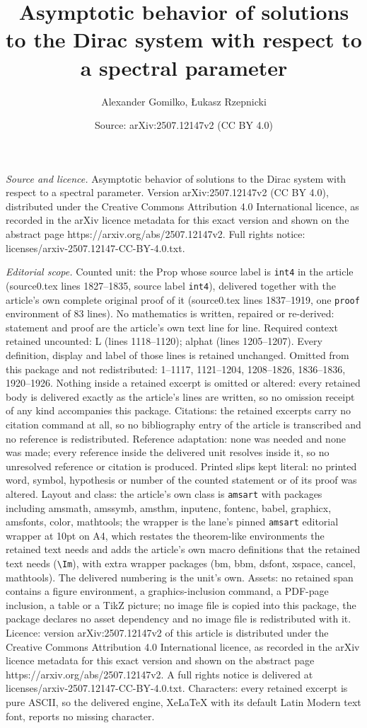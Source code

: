 \documentclass[10pt,a4paper]{amsart}
\title[Asymptotic behavior of solutions to the Dirac system with re]{Asymptotic behavior of solutions to the Dirac system with respect to a spectral parameter}
\author{Alexander Gomilko, {\L}ukasz Rzepnicki}
\date{Source: arXiv:2507.12147v2 (CC BY 4.0)}
\begin{document}
\maketitle

\noindent\emph{Source and licence.} Asymptotic behavior of solutions to the Dirac system with respect to a spectral parameter. Version arXiv:2507.12147v2 (CC BY 4.0), distributed under the Creative Commons Attribution 4.0 International licence, as recorded in the arXiv licence metadata for this exact version and shown on the abstract page https://arxiv.org/abs/2507.12147v2. Full rights notice: licenses/arxiv-2507.12147-CC-BY-4.0.txt.\par\smallskip

\noindent\textit{Editorial scope.} Counted unit: the Prop whose source label is \texttt{int4} in the article (source0.tex lines 1827--1835, source label \texttt{int4}), delivered together with the article's own complete original proof of it (source0.tex lines 1837--1919, one \texttt{proof} environment of 83 lines). No mathematics is written, repaired or re-derived: statement and proof are the article's own text line for line. Required context retained uncounted: L (lines 1118--1120); alphat (lines 1205--1207). Every definition, display and label of those lines is retained unchanged. Omitted from this package and not redistributed: 1--1117, 1121--1204, 1208--1826, 1836--1836, 1920--1926. Nothing inside a retained excerpt is omitted or altered: every retained body is delivered exactly as the article's lines are written, so no omission receipt of any kind accompanies this package. Citations: the retained excerpts carry no citation command at all, so no bibliography entry of the article is transcribed and no reference is redistributed. Reference adaptation: none was needed and none was made; every reference inside the delivered unit resolves inside it, so no unresolved reference or citation is produced. Printed slips kept literal: no printed word, symbol, hypothesis or number of the counted statement or of its proof was altered. Layout and class: the article's own class is \texttt{amsart} with packages including amsmath, amssymb, amsthm, inputenc, fontenc, babel, graphicx, amsfonts, color, mathtools; the wrapper is the lane's pinned \texttt{amsart} editorial wrapper at 10pt on A4, which restates the theorem-like environments the retained text needs and adds the article's own macro definitions that the retained text needs (\texttt{\textbackslash Im}), with extra wrapper packages (bm, bbm, dsfont, xspace, cancel, mathtools). The delivered numbering is the unit's own. Assets: no retained span contains a figure environment, a graphics-inclusion command, a PDF-page inclusion, a table or a TikZ picture; no image file is copied into this package, the package declares no asset dependency and no image file is redistributed with it. Licence: version arXiv:2507.12147v2 of this article is distributed under the Creative Commons Attribution 4.0 International licence, as recorded in the arXiv licence metadata for this exact version and shown on the abstract page https://arxiv.org/abs/2507.12147v2. A full rights notice is delivered at licenses/arxiv-2507.12147-CC-BY-4.0.txt. Characters: every retained excerpt is pure ASCII, so the delivered engine, XeLaTeX with its default Latin Modern text font, reports no missing character.
\end{document}
